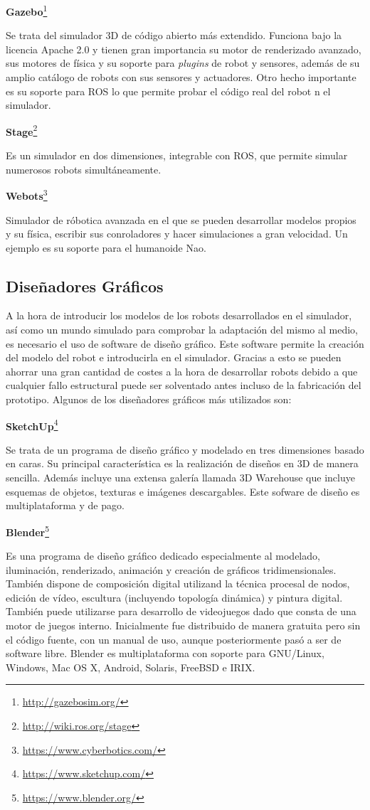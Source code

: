 	\textbf{Gazebo}\footnote{\url{http://gazebosim.org/}}

Se trata del simulador 3D de código abierto más extendido. Funciona bajo la licencia Apache 2.0 y tienen gran importancia su motor de renderizado avanzado, sus motores de física y su soporte para \textit{plugins} de robot y sensores, además de su amplio catálogo de robots con sus sensores y actuadores. Otro hecho importante es su soporte para ROS lo que permite probar el código real del robot n el simulador.

	\textbf{Stage}\footnote{\url{http://wiki.ros.org/stage}}

Es un simulador en dos dimensiones, integrable con ROS, que permite simular numerosos robots simultáneamente.

	\textbf{Webots}\footnote{\url{https://www.cyberbotics.com/}}

Simulador de róbotica avanzada en el que se pueden desarrollar modelos propios y su física, escribir sus conroladores y hacer simulaciones a gran velocidad. Un ejemplo es su soporte para el humanoide Nao.

\subsection{Diseñadores Gráficos}
A la hora de introducir los modelos de los robots desarrollados en el simulador, así como un mundo simulado para comprobar la adaptación del mismo al medio, es necesario el uso de software de diseño gráfico. Este software permite la creación del modelo del robot e introducirla en el simulador. Gracias a esto se pueden ahorrar una gran cantidad de costes a la hora de desarrollar robots debido a que cualquier fallo estructural puede ser solventado antes incluso de la fabricación del prototipo. Algunos de los diseñadores gráficos más utilizados son:

	\textbf{SketchUp}\footnote{\url{https://www.sketchup.com/}}

Se trata de un programa de diseño gráfico y modelado en tres dimensiones basado en caras. Su principal característica es la realización de diseños en 3D de manera sencilla. Además incluye una extensa galería llamada 3D Warehouse que incluye esquemas de objetos, texturas e imágenes descargables. Este sofware de diseño es multiplataforma y de pago.

	\textbf{Blender}\footnote{\url{https://www.blender.org/}}

Es una programa de diseño gráfico dedicado especialmente al modelado, iluminación, renderizado, animación y creación de gráficos tridimensionales. También dispone de composición digital utilizand la técnica procesal de nodos, edición de vídeo, escultura (incluyendo topología dinámica) y pintura digital. También puede utilizarse para desarrollo de videojuegos dado que consta de una motor de juegos interno. Inicialmente fue distribuido de manera gratuita pero sin el código fuente, con un manual de uso, aunque posteriormente pasó a ser de software libre. Blender es multiplataforma con soporte para GNU/Linux, Windows, Mac OS X, Android, Solaris, FreeBSD e IRIX.

